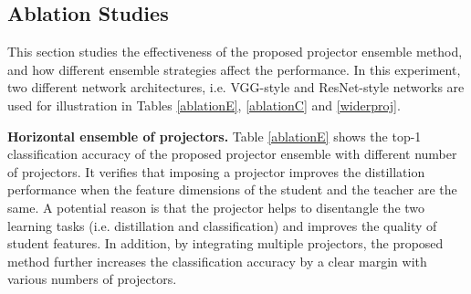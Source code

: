 \documentclass{article}
\begin{document}
\subsection{Ablation Studies} \label{ablationsection}
This section studies the effectiveness of the proposed projector ensemble method, and how different ensemble strategies affect the performance. In this experiment, two different network architectures, i.e. VGG-style and ResNet-style networks are used for illustration in Tables \ref{ablationE}, \ref{ablationC} and \ref{widerproj}.

\textbf{Horizontal ensemble of projectors. }Table \ref{ablationE} shows the top-1 classification accuracy of the proposed projector ensemble with different number of projectors. It verifies that imposing a projector improves the distillation performance when the feature dimensions of the student and the teacher are the same. A potential reason is that the projector helps to disentangle the two learning tasks (i.e. distillation and classification) and improves the quality of student features. In addition, by integrating multiple projectors, the proposed method further increases the classification accuracy by a clear margin with various numbers of projectors. 
\end{document}
